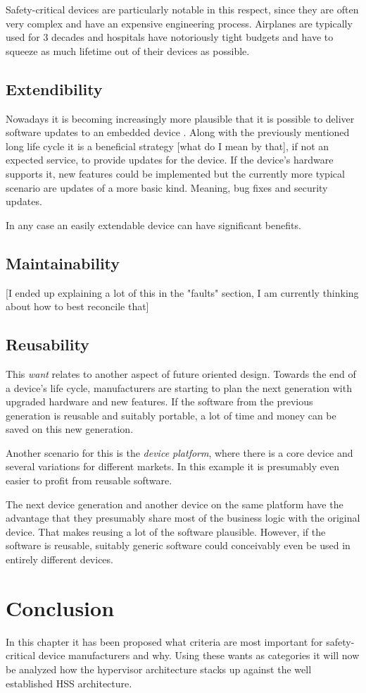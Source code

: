 Safety-critical devices are particularly notable in this respect, since they are often very complex and have an expensive engineering process. Airplanes are typically used for 3 decades and hospitals have notoriously tight budgets and have to squeeze as much lifetime out of their devices as possible. 
\subsection{Extendibility}
Nowadays it is becoming increasingly more plausible that it is possible to deliver software updates to an embedded device \cite{OndrejKachman.2016}. Along with the previously mentioned long life cycle it is a beneficial strategy [what do I mean by that], if not an expected service, to provide updates for the device.
If the device's hardware supports it, new features could be implemented but the currently more typical scenario are updates of a more basic kind. Meaning, bug fixes and security updates.

In any case an easily extendable device can have significant benefits.
\subsection{Maintainability}
[I ended up explaining a lot of this in the "faults" section, I am currently thinking about how to best reconcile that]
\subsection{Reusability}
This \textit{want} relates to another aspect of future oriented design. Towards the end of a device's life cycle, manufacturers are starting to plan the next generation with upgraded hardware and new features. If the software from the previous generation is reusable and suitably portable, a lot of time and money can be saved on this new generation.

Another scenario for this is the \textit{device platform}, where there is a core device and several variations for different markets. In this example it is presumably even easier to profit from reusable software.

The next device generation and another device on the same platform have the advantage that they presumably share most of the business logic with the original device. That makes reusing a lot of the software plausible. However, if the software is reusable, suitably generic software could conceivably even be used in entirely different devices.

\section{Conclusion}
In this chapter it has been proposed what criteria are most important for safety-critical device manufacturers and why. Using these wants as categories it will now be analyzed how the hypervisor architecture stacks up against the well established \gls{HSS} architecture.